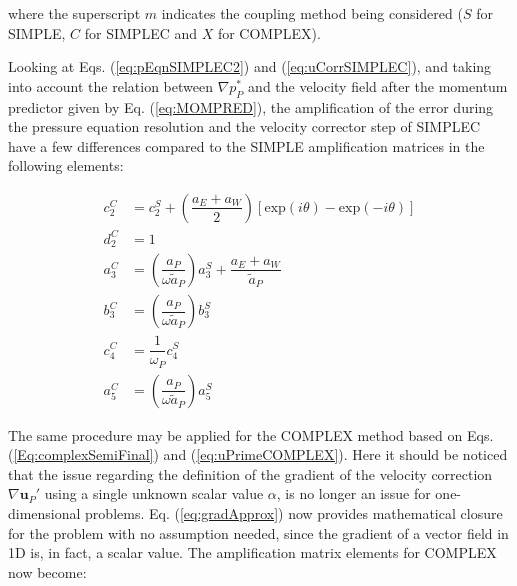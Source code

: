 \documentclass[final,3p,times,10pt,onecolumn]{myElsarticle}
\numberwithin{equation}{section}
\begin{document}
\noindent where the superscript $m$ indicates the coupling method being considered ($S$ for SIMPLE, $C$ for SIMPLEC and $X$ for COMPLEX).

Looking at Eqs. (\ref{eq:pEqnSIMPLEC2}) and (\ref{eq:uCorrSIMPLEC}), and taking into account the relation between $\nabla p_P^*$ and the velocity field after the momentum predictor given by Eq. (\ref{eq:MOMPRED}), the amplification of the error during the pressure equation resolution and the velocity corrector step of SIMPLEC have a few differences compared to the SIMPLE amplification matrices in the following elements:

\begin{equation}
\begin{split}
     c^C_2 &= c_2^S + \left(\dfrac{a_E + a_W}{2}\right) [\text{exp} (i    \theta) - \text{exp} (-i \theta)] \\
     d^C_2 &= 1 \\
     a^C_3 &= \left(\dfrac{a_P}{\omega \tilde{a}_P}\right) a_3^S + \dfrac{a_E+a_W}{\tilde{a}_P} \\
     b^C_3 &= \left(\dfrac{a_P}{\omega \tilde{a}_P}\right) b_3^S \\ 
     c^C_4 &= \dfrac{1}{\omega_P} c^S_4 \\
     a^C_5 &= \left(\dfrac{a_P}{\omega \tilde{a}_P}\right) a^S_5     
\end{split}
\end{equation}

The same procedure may be applied for the COMPLEX method based on Eqs. (\ref{Eq:complexSemiFinal}) and (\ref{eq:uPrimeCOMPLEX}). Here it should be noticed that the issue regarding the definition of the gradient of the velocity correction $\nabla \boldsymbol{u}_P'$ using a single unknown scalar value $\alpha$, is no longer an issue for one-dimensional problems. Eq. (\ref{eq:gradApprox}) now provides mathematical closure for the problem with no assumption needed, since the gradient of a vector field in 1D is, in fact, a scalar value. The amplification matrix elements for COMPLEX now become:
\end{document}
